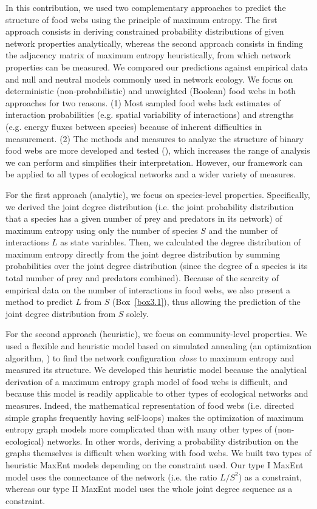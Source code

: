In this contribution, we used two complementary approaches to predict the
structure of food webs using the principle of maximum entropy. The first
approach consists in deriving constrained probability distributions of given
network properties analytically, whereas the second approach consists in finding
the adjacency matrix of maximum entropy heuristically, from which network
properties can be measured. We compared our predictions against empirical data
and null and neutral models commonly used in network ecology. We focus on
deterministic (non-probabilistic) and unweighted (Boolean) food webs in both
approaches for two reasons. (1) Most sampled food webs lack estimates of
interaction probabilities (e.g. spatial variability of interactions) and
strengths (e.g. energy fluxes between species) because of inherent difficulties
in measurement. (2) The methods and measures to analyze the structure of binary
food webs are more developed and tested (\cite{Delmas2019Analysing}), which
increases the range of analysis we can perform and simplifies their
interpretation. However, our framework can be applied to all types of ecological
networks and a wider variety of measures.

For the first approach (analytic), we focus on species-level properties.
Specifically, we derived the joint degree distribution (i.e. the joint
probability distribution that a species has a given number of prey and predators
in its network) of maximum entropy using only the number of species $S$ and the
number of interactions $L$ as state variables. Then, we calculated the degree
distribution of maximum entropy directly from the joint degree distribution by
summing probabilities over the joint degree distribution (since the degree of a
species is its total number of prey and predators combined). Because of the
scarcity of empirical data on the number of interactions in food webs, we also
present a method to predict $L$ from $S$ (Box~\ref{box3.1}), thus allowing the
prediction of the joint degree distribution from $S$ solely. 

For the second approach (heuristic), we focus on community-level properties. We
used a flexible and heuristic model based on simulated annealing (an
optimization algorithm, \cite{Kirkpatrick1983Optimization}) to find the network
configuration \textit{close} to maximum entropy and measured its structure. We
developed this heuristic model because the analytical derivation of a maximum
entropy graph model of food webs is difficult, and because this model is readily
applicable to other types of ecological networks and measures. Indeed, the
mathematical representation of food webs (i.e. directed simple graphs frequently
having self-loops) makes the optimization of maximum entropy graph models more
complicated than with many other types of (non-ecological) networks. In other
words, deriving a probability distribution on the graphs themselves is difficult
when working with food webs. We built two types of heuristic MaxEnt models
depending on the constraint used. Our type I MaxEnt model uses the connectance
of the network (i.e. the ratio $L/S^2$) as a constraint, whereas our type II
MaxEnt model uses the whole joint degree sequence as a constraint. 

